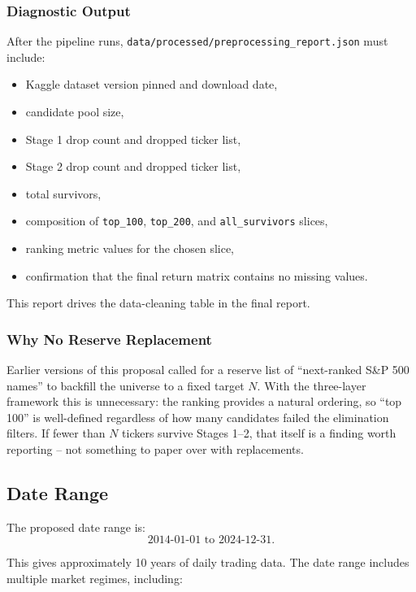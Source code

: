 \documentclass[11pt]{article}
\begin{document}
\subsubsection{Diagnostic Output}

After the pipeline runs, \texttt{data/processed/preprocessing\_report.json} must include:
\begin{itemize}
    \item Kaggle dataset version pinned and download date,
    \item candidate pool size,
    \item Stage 1 drop count and dropped ticker list,
    \item Stage 2 drop count and dropped ticker list,
    \item total survivors,
    \item composition of \texttt{top\_100}, \texttt{top\_200}, and \texttt{all\_survivors} slices,
    \item ranking metric values for the chosen slice,
    \item confirmation that the final return matrix contains no missing values.
\end{itemize}

This report drives the data-cleaning table in the final report.

\subsubsection{Why No Reserve Replacement}

Earlier versions of this proposal called for a reserve list of ``next-ranked S\&P 500 names'' to backfill the universe to a fixed target $N$. With the three-layer framework this is unnecessary: the ranking provides a natural ordering, so ``top 100'' is well-defined regardless of how many candidates failed the elimination filters. If fewer than $N$ tickers survive Stages 1--2, that itself is a finding worth reporting -- not something to paper over with replacements.

\subsection{Date Range}

The proposed date range is:
\[
\text{2014-01-01 to 2024-12-31}.
\]

This gives approximately 10 years of daily trading data. The date range includes multiple market regimes, including:
\end{document}

